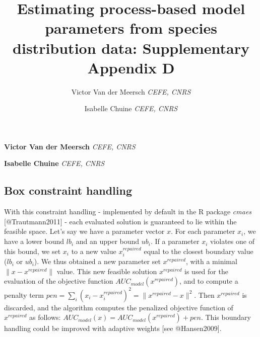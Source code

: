 \documentclass[11pt,]{article}
\title{Estimating process-based model parameters from species
distribution data: Supplementary Appendix D  }
\author{\Large Victor Van der
Meersch\vspace{0.05in} \newline\newline\normalsize\emph{CEFE,
CNRS}   \and \Large Isabelle
Chuine\vspace{0.05in} \newline\newline\normalsize\emph{CEFE, CNRS}  }
\date{}
\newcommand*{\authorfont}{\fontfamily{phv}\selectfont}
\begin{document}
%

{%
\setlength{\parindent}{0pt}
\thispagestyle{plain}
{\fontsize{18}{20}\selectfont\raggedright
\maketitle  %

}

{
   \vskip 13.5pt\relax \normalsize\fontsize{11}{12}
\textbf{\authorfont Victor Van der
Meersch} \hskip 15pt \emph{\small CEFE,
CNRS}   \par \textbf{\authorfont Isabelle
Chuine} \hskip 15pt \emph{\small CEFE, CNRS}   

}

}






\vskip -8.5pt



\noindent 

\hfill \break

\hypertarget{box-constraint-handling}{%
\subsection{Box constraint handling}\label{box-constraint-handling}}

With this constraint handling - implemented by default in the R package
\emph{cmaes} {[}@Trautmann2011{]} - each evaluated solution is
guaranteed to lie within the feasible space. Let's say we have a
parameter vector \(x\). For each parameter \(x_i\), we have a lower
bound \(lb_i\) and an upper bound \(ub_i\). If a parameter \(x_i\)
violates one of this bound, we set \(x_i\) to a new value
\(x_i^{repaired}\) equal to the closest boundary value (\(lb_i\) or
\(ub_i\)). We thus obtained a new parameter set \(x^{repaired}\), with a
minimal \(\|x-x^{repaired}\|\) value. This new feasible solution
\(x^{repaired}\) is used for the evaluation of the objective function
\(AUC_{model}(x^{repaired})\), and to compute a penalty term
\(pen=\sum\limits_{i}(x_i-x_i^{repaired})^2=\|x^{repaired}-x\|^2\). Then
\(x^{repaired}\) is discarded, and the algorithm computes the penalized
objective function of \(x^{repaired}\) as follows:
\(AUC_{model}(x)=AUC_{model}(x^{repaired})+pen\). This boundary handling
could be improved with adaptive weights {[}see @Hansen2009{]}.
\end{document}
